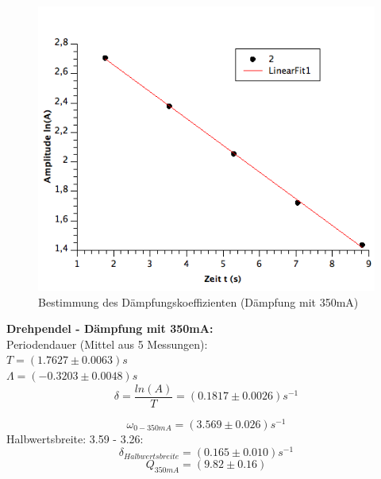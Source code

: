 \documentclass[12pt,a4paper]{article}
\begin{document}
\pagebreak
\begin{multicols}{2}

\begin{figure}[H]
	\centering
	\includegraphics[scale=0.4]{./figure/Messung1_Daempfung_omega0-350mA.png}
	\caption{Bestimmung des Dämpfungskoeffizienten (Dämpfung mit 350mA)}
	\label{fig:daempfung_omega0_350mA}
\end{figure}

\noindent \textbf{Drehpendel - Dämpfung mit 350mA:}\\
\noindent Periodendauer (Mittel aus 5 Messungen):\\
$T = (1.7627 \pm 0.0063)s$\\
$\Lambda = (-0.3203 \pm 0.0048)s$
$$\delta = \frac{ln(A)}{T} = (0.1817 \pm 0.0026)s^{-1}$$

$$\omega_{0 - 350mA}=(3.569 \pm 0.026)s^{-1}$$
Halbwertsbreite: 3.59 - 3.26:\\
$$\delta_{Halbwertsbreite} = (0.165 \pm 0.010)s^{-1}$$
$$Q_{350mA}=(9.82 \pm 0.16)$$


\end{multicols}
\end{document}
